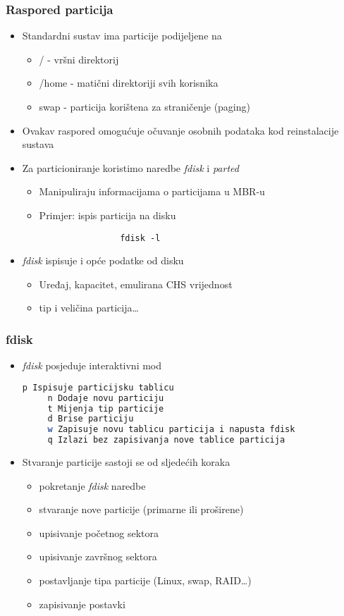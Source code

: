 \documentclass[croatian,t]{beamer} %
\begin{document}
	\begin{frame}[fragile]
	\frametitle{Raspored particija}
		\begin{itemize}
			\item Standardni sustav ima particije podijeljene na
			\begin{itemize}
				\item / - vršni direktorij
				\item /home - matični direktoriji svih korisnika
				\item swap - particija korištena za straničenje (paging)
			\end{itemize}
			\item Ovakav raspored omogućuje očuvanje osobnih podataka kod reinstalacije sustava
			\item Za particioniranje koristimo naredbe \textit{fdisk} i \textit{parted}
			\begin{itemize}
				\item Manipuliraju informacijama o particijama u MBR-u
				\item Primjer: ispis particija na disku
				\begin{lstlisting}
				fdisk -l
				\end{lstlisting}
			\end{itemize}
			\item \textit{fdisk} ispisuje i opće podatke od disku
			\begin{itemize}
				\item Uređaj, kapacitet, emulirana CHS vrijednost
				\item tip i veličina particija\ldots
			\end{itemize}
		\end{itemize}
	\end{frame}
	
	\begin{frame}[fragile]
	\frametitle{fdisk}
		\begin{itemize}
		\item \textit{fdisk} posjeduje interaktivni mod
		\begin{lstlisting}[basicstyle={\footnotesize\ttfamily},language=bash]
     p Ispisuje particijsku tablicu
     n Dodaje novu particiju
     t Mijenja tip particije
     d Brise particiju
     w Zapisuje novu tablicu particija i napusta fdisk
     q Izlazi bez zapisivanja nove tablice particija
		\end{lstlisting}
		\item Stvaranje particije sastoji se od sljedećih koraka
		\begin{itemize}
			\item pokretanje \textit{fdisk} naredbe
			\item stvaranje nove particije (primarne ili proširene)
			\item upisivanje početnog sektora
			\item upisivanje završnog sektora
			\item postavljanje tipa particije (Linux, swap, RAID\ldots)
			\item zapisivanje postavki
		\end{itemize}
		\end{itemize}
	\end{frame}
	
\end{document}
